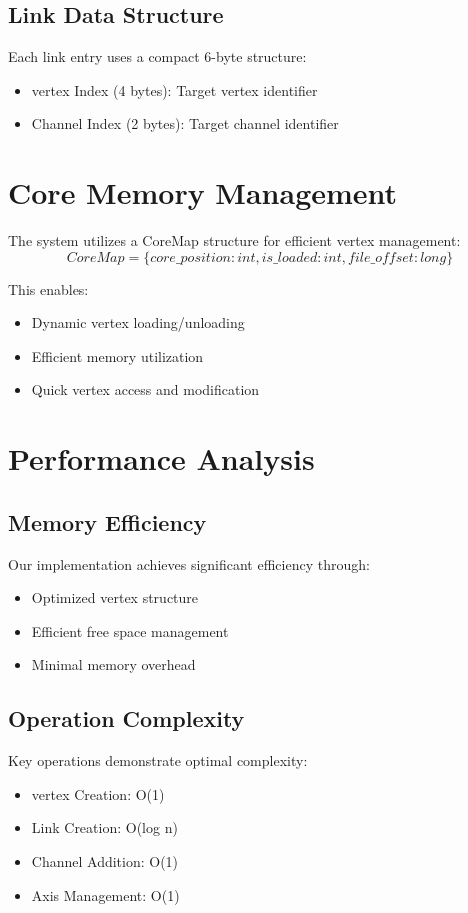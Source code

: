 \subsection{Link Data Structure}
Each link entry uses a compact 6-byte structure:
\begin{itemize}
    \item vertex Index (4 bytes): Target vertex identifier
    \item Channel Index (2 bytes): Target channel identifier
\end{itemize}

\section{Core Memory Management}\label{Sec:CoreMemory}
The system utilizes a CoreMap structure for efficient vertex management:
\begin{equation}
    CoreMap = \{core\_position: int, is\_loaded: int, file\_offset: long\}
\end{equation}

This enables:
\begin{itemize}
    \item Dynamic vertex loading/unloading
    \item Efficient memory utilization
    \item Quick vertex access and modification
\end{itemize}

\section{Performance Analysis}\label{Sec:Performance}
\subsection{Memory Efficiency}
Our implementation achieves significant efficiency through:
\begin{itemize}
    \item Optimized vertex structure
    \item Efficient free space management
    \item Minimal memory overhead
\end{itemize}

\subsection{Operation Complexity}
Key operations demonstrate optimal complexity:
\begin{itemize}
    \item vertex Creation: O(1)
    \item Link Creation: O(log n)
    \item Channel Addition: O(1)
    \item Axis Management: O(1)
\end{itemize}

